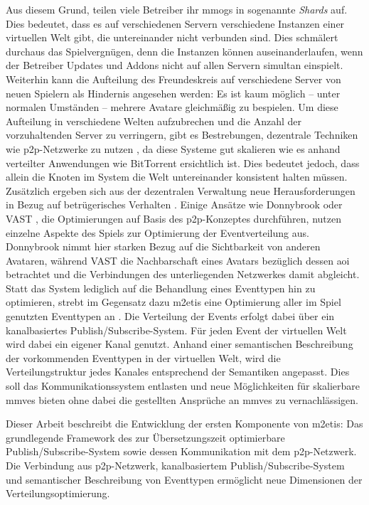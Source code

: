 Aus diesem Grund, teilen viele Betreiber ihr \acp{mmog} in sogenannte \emph{Shards} auf. Dies bedeutet, dass es auf verschiedenen Servern verschiedene Instanzen einer virtuellen Welt gibt, die untereinander nicht verbunden sind. Dies schmälert durchaus das Spielvergnügen, denn die Instanzen können auseinanderlaufen, wenn der Betreiber Updates und Addons nicht auf allen Servern simultan einspielt. Weiterhin kann die Aufteilung des Freundeskreis auf verschiedene Server von neuen Spielern als Hindernis angesehen werden: Es ist kaum möglich -- unter normalen Umständen -- mehrere Avatare gleichmäßig zu bespielen. Um diese Aufteilung in verschiedene Welten aufzubrechen und die Anzahl der vorzuhaltenden Server zu verringern, gibt es Bestrebungen, dezentrale Techniken wie \ac{p2p}-Netzwerke zu nutzen \cite{Knutsson2004Peertopeer, Triebel2008Peertopeer}, da diese Systeme gut skalieren wie es anhand verteilter Anwendungen wie BitTorrent ersichtlich ist. Dies bedeutet jedoch, dass allein die Knoten im System die Welt untereinander konsistent halten müssen. Zusätzlich ergeben sich aus der dezentralen Verwaltung neue Herausforderungen in Bezug auf betrügerisches Verhalten \cite{Kabus2007Design}. Einige Ansätze wie Donnybrook \cite{Bharambe2008Donnybrook} oder VAST \cite{Backhaus2007Voronoibased}, die Optimierungen auf Basis des \ac{p2p}-Konzeptes durchführen, nutzen einzelne Aspekte des Spiels zur Optimierung der Eventverteilung aus. Donnybrook nimmt hier starken Bezug auf die Sichtbarkeit von anderen Avataren, während VAST die Nachbarschaft eines Avatars bezüglich dessen \ac{aoi} betrachtet und die Verbindungen des unterliegenden Netzwerkes damit abgleicht. Statt das System lediglich auf die Behandlung eines Eventtypen hin zu optimieren, strebt im Gegensatz dazu \ac{m2etis} eine Optimierung aller im Spiel genutzten Eventtypen an \cite{Fischer2010a}.
Die Verteilung der Events erfolgt dabei über ein kanalbasiertes Publish/Subscribe-System.  Für jeden Event der virtuellen Welt wird dabei ein eigener Kanal genutzt. Anhand einer semantischen Beschreibung der vorkommenden Eventtypen in der virtuellen Welt, wird die Verteilungstruktur jedes Kanales entsprechend der Semantiken angepasst. Dies soll das Kommunikationssystem entlasten und neue Möglichkeiten für skalierbare \acp{mmve} bieten ohne dabei die gestellten Ansprüche an \acp{mmve} zu vernachlässigen.

Dieser Arbeit beschreibt die Entwicklung der ersten Komponente von \ac{m2etis}: Das grundlegende Framework des zur Übersetzungszeit optimierbare Publish/Subscribe-System sowie dessen Kommunikation mit dem \ac{p2p}-Netzwerk. Die Verbindung aus \ac{p2p}-Netzwerk, kanalbasiertem Publish/Subscribe-System und semantischer Beschreibung von Eventtypen ermöglicht neue Dimensionen der Verteilungsoptimierung.

